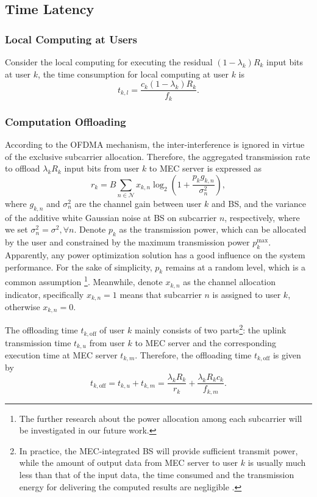 \documentclass[journal]{IEEEtran}
\begin{document}
\subsection{Time Latency}
\subsubsection{Local Computing at Users} 
Consider the local computing for executing the residual $(1-\lambda_k)R_k$ input bits  at user $k$, the time consumption for local computing at user $k$ is
\begin{equation}\label{local time}
t_{k,l} =\frac{c_{k}\left(1-\lambda_{k}\right)R_{k}}{f_{k}}.
\end{equation}
\subsubsection{Computation Offloading} 
According to the OFDMA mechanism, the inter-interference is ignored in virtue of the exclusive subcarrier allocation. Therefore, the aggregated transmission rate to offload $\lambda_kR_k$ input bits from user $k$ to MEC server is expressed as
\begin{equation}\label{r_k}
    r_k =B\sum_{n\in\mathcal{N}}x_{k,n}\log_2\left(1+\frac{p_{k}g_{k,n}}{\sigma_n^2}\right),
\end{equation}
where $g_{k,n}$ and $\sigma_n^2$ are the channel gain between user $k$ and BS, and the variance of the additive white Gaussian noise at BS on subcarrier $n$, respectively, where we set $\sigma_n^2=\sigma^2, \forall n$. Denote $p_{k}$ as the transmission power, which can be allocated by the user and constrained by the maximum transmission power $p_k^\text{max}$. Apparently, any power optimization solution has a good influence on the system performance. For the sake of simplicity, $p_k$ remains at a random level, which is a common assumption \cite{Yang2019Access,wenJoint}\footnote{The further research about the power allocation among each subcarrier will be investigated in our future work.}. Meanwhile, denote $x_{k,n}$ as the channel allocation indicator, specifically $x_{k,n}=1$ means that subcarrier $n$ is assigned to user $k$, otherwise $x_{k,n}=0$.

The offloading time $t_{k,\text{off}}$ of user $k$ mainly consists of two parts\footnote{In practice, the MEC-integrated BS will provide sufficient transmit power, while the amount of output data from MEC server to user $k$ is usually much less than that of the input data, the time consumed and the transmission energy for delivering the computed results are negligible \cite{Hu2018Wireless}.\label{footnote1}}: the uplink transmission time $t_{k,u}$ from user $k$ to MEC server and the corresponding execution time at MEC server $t_{k,m}$. Therefore, the offloading time $t_{k,\text{off}}$ is given by 
\begin{equation}\label{t_off}
t_{k,\text{off}}=t_{k,u}+t_{k,m}=\frac{\lambda_{k}R_{k}}{r_{k}}+\frac{\lambda_{k}R_{k}c_{k}}{f_{k,m}}.
\end{equation}
\end{document}
